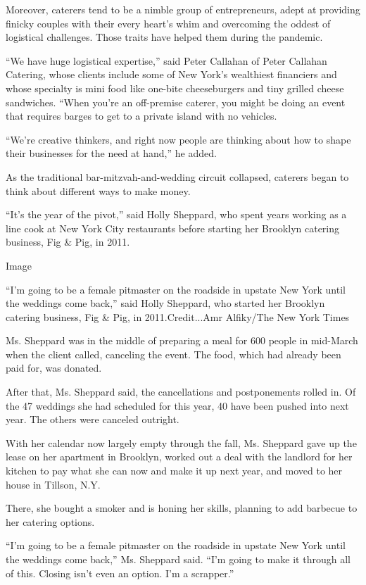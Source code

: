 Moreover, caterers tend to be a nimble group of entrepreneurs, adept at
providing finicky couples with their every heart's whim and overcoming
the oddest of logistical challenges. Those traits have helped them
during the pandemic.

``We have huge logistical expertise,'' said Peter Callahan of Peter
Callahan Catering, whose clients include some of New York's wealthiest
financiers and whose specialty is mini food like one-bite cheeseburgers
and tiny grilled cheese sandwiches. ``When you're an off-premise
caterer, you might be doing an event that requires barges to get to a
private island with no vehicles.

``We're creative thinkers, and right now people are thinking about how
to shape their businesses for the need at hand,'' he added.

As the traditional bar-mitzvah-and-wedding circuit collapsed, caterers
began to think about different ways to make money.

``It's the year of the pivot,'' said Holly Sheppard, who spent years
working as a line cook at New York City restaurants before starting her
Brooklyn catering business, Fig \& Pig, in 2011.

Image

``I'm going to be a female pitmaster on the roadside in upstate New York
until the weddings come back,'' said Holly Sheppard, who started her
Brooklyn catering business, Fig \& Pig, in 2011.Credit...Amr Alfiky/The
New York Times

Ms. Sheppard was in the middle of preparing a meal for 600 people in
mid-March when the client called, canceling the event. The food, which
had already been paid for, was donated.

After that, Ms. Sheppard said, the cancellations and postponements
rolled in. Of the 47 weddings she had scheduled for this year, 40 have
been pushed into next year. The others were canceled outright.

With her calendar now largely empty through the fall, Ms. Sheppard gave
up the lease on her apartment in Brooklyn, worked out a deal with the
landlord for her kitchen to pay what she can now and make it up next
year, and moved to her house in Tillson, N.Y.

There, she bought a smoker and is honing her skills, planning to add
barbecue to her catering options.

``I'm going to be a female pitmaster on the roadside in upstate New York
until the weddings come back,'' Ms. Sheppard said. ``I'm going to make
it through all of this. Closing isn't even an option. I'm a scrapper.''

